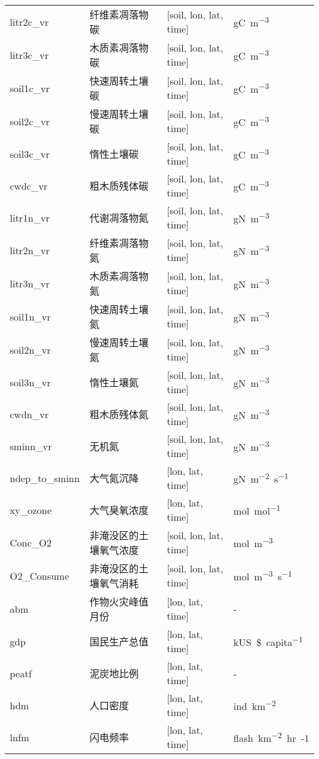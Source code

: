 {\begin{longtable}[htbp]{lp{}ll}
litr2c\_vr & 纤维素凋落物碳 & {[}soil, lon, lat, time{]}  & \unit{gC.m^{-3}} \\
litr3c\_vr & 木质素凋落物碳 & {[}soil, lon, lat, time{]}  & \unit{gC.m^{-3}} \\
soil1c\_vr & 快速周转土壤碳 & {[}soil, lon, lat, time{]}  & \unit{gC.m^{-3}} \\
soil2c\_vr & 慢速周转土壤碳 & {[}soil, lon, lat, time{]}  & \unit{gC.m^{-3}} \\
soil3c\_vr & 惰性土壤碳 & {[}soil, lon, lat, time{]}  & \unit{gC.m^{-3}} \\
cwdc\_vr & 粗木质残体碳 & {[}soil, lon, lat, time{]}  & \unit{gC.m^{-3}} \\
litr1n\_vr & 代谢凋落物氮 & {[}soil, lon, lat, time{]}  & \unit{gN.m^{-3}} \\
litr2n\_vr & 纤维素凋落物氮 & {[}soil, lon, lat, time{]}  & \unit{gN.m^{-3}} \\
litr3n\_vr & 木质素凋落物氮 & {[}soil, lon, lat, time{]}  & \unit{gN.m^{-3}} \\
soil1n\_vr & 快速周转土壤氮 & {[}soil, lon, lat, time{]}  & \unit{gN.m^{-3}} \\
soil2n\_vr & 慢速周转土壤氮 & {[}soil, lon, lat, time{]}  & \unit{gN.m^{-3}} \\
soil3n\_vr & 惰性土壤氮 & {[}soil, lon, lat, time{]}  & \unit{gN.m^{-3}} \\
cwdn\_vr & 粗木质残体氮 & {[}soil, lon, lat, time{]}  & \unit{gN.m^{-3}} \\
sminn\_vr & 无机氮 & {[}soil, lon, lat, time{]}  & \unit{gN.m^{-3}} \\
ndep\_to\_sminn & 大气氮沉降 & {[}lon, lat, time{]}  & \unit{gN.m^{-2}.s^{-1}} \\
xy\_ozone & 大气臭氧浓度 & {[}lon, lat, time{]}  & \unit{mol.mol^{-1}} \\
Conc\_O2 & 非淹没区的土壤氧气浓度 & {[}soil, lon, lat, time{]} & \unit{mol.m^{-3}} \\
O2\_Consume & 非淹没区的土壤氧气消耗 & {[}soil, lon, lat, time{]} & \unit{mol.m^{-3}.s^{-1}} \\
abm & 作物火灾峰值月份 & {[}lon, lat, time{]} & - \\
gdp & 国民生产总值 & {[}lon, lat, time{]} & \unit{kUS\$.capita^{-1}}\\
peatf & 泥炭地比例 & {[}lon, lat, time{]} & - \\
hdm & 人口密度 & {[}lon, lat, time{]} & \unit{ind.km^{-2}}\\
lnfm & 闪电频率 & {[}lon, lat, time{]} & \unit{flash.km^{-2}.hr{-1}} \\

\end{longtable}}
